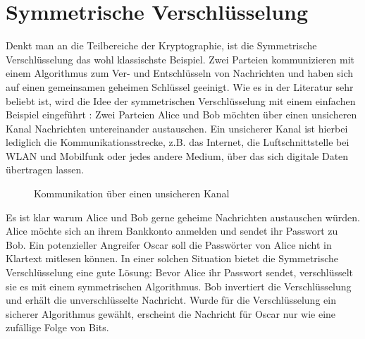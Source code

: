\section{Symmetrische Verschlüsselung}
Denkt man an die Teilbereiche der Kryptographie, ist die Symmetrische Verschlüsselung
das wohl klassischste Beispiel. Zwei Parteien kommunizieren mit einem
Algorithmus zum Ver- und Entschlüsseln von Nachrichten und haben sich auf einen
gemeinsamen geheimen Schlüssel geeinigt. Wie es in der Literatur sehr beliebt ist,
wird die Idee der symmetrischen Verschlüsselung
mit einem einfachen Beispiel eingeführt \parencite[4-6]{BOOK:crypto}:
Zwei Parteien Alice und Bob möchten über einen unsicheren Kanal Nachrichten untereinander austauschen.
Ein unsicherer Kanal ist hierbei lediglich die Kommunikationsstrecke,
z.B. das Internet, die Luftschnittstelle bei WLAN und Mobilfunk
oder jedes andere Medium, über das sich digitale Daten übertragen lassen.

\begin{figure}[h]
  \begin{center}


  \end{center}
  \caption{Kommunikation über einen unsicheren Kanal}
\end{figure}

\noindent
Es ist klar warum Alice und Bob gerne geheime Nachrichten austauschen würden. Alice möchte sich an ihrem
Bankkonto anmelden und sendet ihr Passwort zu Bob. Ein potenzieller Angreifer Oscar
soll die Passwörter von Alice nicht in Klartext mitlesen können.
In einer solchen Situation bietet die Symmetrische Verschlüsselung eine gute Lösung:
Bevor Alice ihr Passwort sendet, verschlüsselt sie es mit einem symmetrischen Algorithmus.
Bob invertiert die Verschlüsselung und erhält die unverschlüsselte Nachricht. Wurde für
die Verschlüsselung ein sicherer Algorithmus gewählt, erscheint die Nachricht für Oscar nur wie
eine zufällige Folge von Bits.
\newpage


